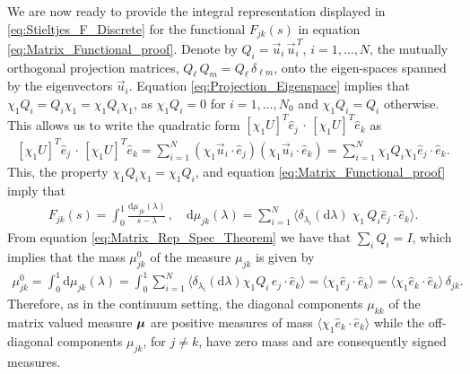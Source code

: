\documentclass{cmslatex}
\renewcommand{\d}{\text{d}}
\newcommand\bmu{\mbox{\boldmath${\mu}$}}
\begin{document}
We are now ready to provide the integral representation displayed in
\eqref{eq:Stieltjes_F_Discrete} for the functional $F_{jk}(s)$ in
equation \eqref{eq:Matrix_Functional_proof}. Denote by
$Q_i=\vec{u}_i\,\vec{u}_i^{\,T}$, $i=1,\ldots,N$, the mutually orthogonal
projection matrices, $Q_\ell\,Q_m=Q_\ell\,\delta_{\ell m}$, onto the eigen-spaces
spanned by the eigenvectors $\vec{u}_i$. Equation
\eqref{eq:Projection_Eigenspace} implies that
$\chi_1Q_i=Q_i\chi_1=\chi_1Q_i\chi_1$, as $\chi_1Q_i=0$ for $i=1,\ldots,N_0$ and
$\chi_1Q_i=Q_i$ otherwise. This allows us to write the quadratic form
$[\chi_1U]^T\hat{e}_j\,\cdot\,[\chi_1U]^T\hat{e}_k$ as  
%
\begin{align}\label{eq:Quadratic_form}
  [\chi_1U]^T\hat{e}_j\,\cdot\,[\chi_1U]^T\hat{e}_k=\sum_{i=1}^N(\chi_1\vec{u}_i\cdot\hat{e}_j)
                                     (\chi_1\vec{u}_i\cdot\hat{e}_k)
                              =\sum_{i=1}^N \chi_1Q_i\chi_1\hat{e}_j\cdot\hat{e}_k.
\end{align}
%
This, the property $\chi_1Q_i\chi_1=\chi_1Q_i$, and equation
\eqref{eq:Matrix_Functional_proof} imply that      
%
\begin{align}\label{eq:Stieltjes_F_DiscretE}
  F_{jk}(s)=\int_0^1\frac{\d\mu_{jk}(\lambda)}{s-\lambda}\,, \quad
  \d\mu_{jk}(\lambda)=\sum_{i=1}^N\langle \delta_{\lambda_i}(\d\lambda)\;\chi_1\,Q_i\hat{e}_j\cdot\hat{e}_k\rangle.
\end{align}
%
From equation \eqref{eq:Matrix_Rep_Spec_Theorem} we have that
$\sum_iQ_i=I$, which implies that the mass $\mu^0_{jk}$ of the measure
$\mu_{jk}$ is given by
%
\begin{align}\label{eq:Measure_Mass_Lattice}
  \mu^0_{jk}=\int_0^1\d\mu_{jk}(\lambda)
       =\int_0^1\sum_{i=1}^N \langle\delta_{\lambda_i}(\d\lambda)\chi_1Q_i\,\hat{e}_j\cdot\hat{e}_k\rangle
       =\langle\chi_1\hat{e}_j\cdot\hat{e}_k\rangle
       =\langle\chi_1\hat{e}_k\cdot\hat{e}_k\rangle\,\delta_{jk}.           
\end{align}
%
Therefore, as in the continuum setting, the diagonal components
$\mu_{kk}$ of the matrix valued measure $\bmu$ are positive measures of
mass $\langle\chi_1\hat{e}_k\cdot\hat{e}_k\rangle$ while the off-diagonal components
$\mu_{jk}$, for $j\neq k$, have zero mass and are consequently signed
measures.
\end{document}
